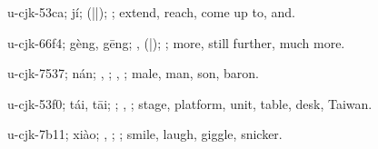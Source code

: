 \begin{multicols}{2}
{\cjkgGlue{}u-cjk-53ca; jí; \cjkgGlue{}\cjkgGlue{}(\cjkgGlue{}|\cjkgGlue{}|\cjkgGlue{}); \cjkgGlue{}; extend, reach, come up to, and.

\cjkgGlue{}u-cjk-66f4; gèng, gēng; \cjkgGlue{}\cjkgGlue{}\cjkgGlue{}, \cjkgGlue{}\cjkgGlue{}(\cjkgGlue{}|\cjkgGlue{}); \cjkgGlue{}; more, still further, much more.

\cjkgGlue{}u-cjk-7537; nán; \cjkgGlue{}, \cjkgGlue{}; \cjkgGlue{}, \cjkgGlue{}; male, man, son, baron.

\cjkgGlue{}u-cjk-53f0; tái, tāi; \cjkgGlue{}; \cjkgGlue{}, \cjkgGlue{}; stage, platform, unit, table, desk, Taiwan.

\cjkgGlue{}u-cjk-7b11; xiào; \cjkgGlue{}\cjkgGlue{}\cjkgGlue{}, \cjkgGlue{}\cjkgGlue{}\cjkgGlue{}; \cjkgGlue{}; smile, laugh, giggle, snicker.

}
\end{multicols}
